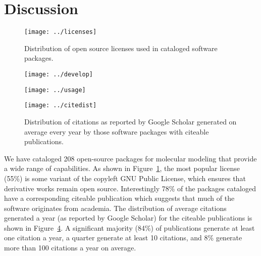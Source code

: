 \section{Discussion}

\begin{figure}
\centering 
\texttt{[image: ../licenses]}
\caption{\label{licenses} Distribution of open source licenses used in cataloged software packages.}
\end{figure}

\begin{figure*}
\centering
\begin{subfigure}[t]{.4\linewidth}
\centering 
\texttt{[image: ../develop]}
\caption{\label{develop}}
\end{subfigure}
\hfill
\begin{subfigure}[t]{.4\linewidth}
\centering 
\texttt{[image: ../usage]}
\caption{\label{usage}}
\end{subfigure}
\caption{\label{pies} Activity distributions of cataloged software packages.
() Distribution of development activity. () Distribution of user activity.
}
\end{figure*}

\begin{figure}
\centering 
\texttt{[image: ../citedist]}
\caption{\label{cites} Distribution of citations as reported by Google Scholar generated on average every year by those software packages with citeable publications.}
\end{figure}


We have cataloged 208 open-source packages for molecular modeling that provide a wide range of capabilities.  As shown in Figure~\ref{licenses}, the most popular license (55\%) is some variant of the copyleft GNU Public License, which ensures that derivative works remain open source.  Interestingly 78\% of the packages cataloged have a corresponding citeable publication which suggests that much of the software originates from academia.   The distribution of average citations generated a year (as reported by Google Scholar) for the citeable publications is shown in Figure~\ref{cites}.  A significant majority (84\%) of publications generate at least one citation a year, a quarter generate at least 10 citations, and 8\% generate more than 100 citations a year on average.

